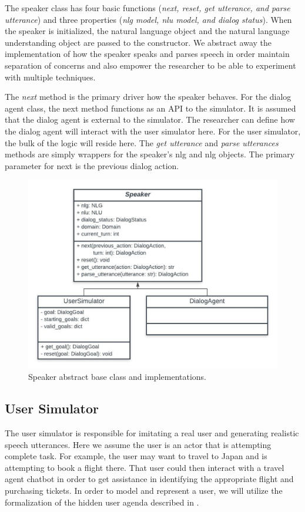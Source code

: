 The speaker class has four basic functions (\textit{next, reset, get utterance, and parse utterance}) and three properties (\textit{nlg model, nlu model, and dialog status}). When the speaker is initialized, the natural language object and the natural language understanding object are passed to the constructor. We abstract away the implementation of how the speaker speaks and parses speech in order maintain separation of concerns and also empower the researcher to be able to experiment with multiple techniques. 

The \textit{next} method is the primary driver how the speaker behaves. For the dialog agent class, the next method functions as an API to the simulator. It is assumed that the dialog agent is external to the simulator. The researcher can define how the dialog agent will interact with the user simulator here. For the user simulator, the bulk of the logic will reside here. The \textit{get utterance} and \textit{parse utterances} methods are simply wrappers for the speaker's nlg and nlg objects. The primary parameter for next is the previous dialog action. 

\begin{figure}[h!]
	\centering
	\includegraphics[width=\linewidth]{diagrams/speaker_classes.jpeg}
	\caption{ Speaker abstract base class and implementations.}
	\label{fig:speaker_class}
\end{figure}

\subsection{User Simulator}
The user simulator is responsible for imitating a real user and generating realistic speech utterances. Here we assume the user is an actor that is attempting complete task. For example, the user may want to travel to Japan and is attempting to book a flight there. That user could then interact with a travel agent chatbot in order to get assistance in identifying the appropriate flight and purchasing tickets. In order to model and represent a user, we will utilize the formalization of the hidden user agenda described in \cite{Schatzmann2009TheHA}.

